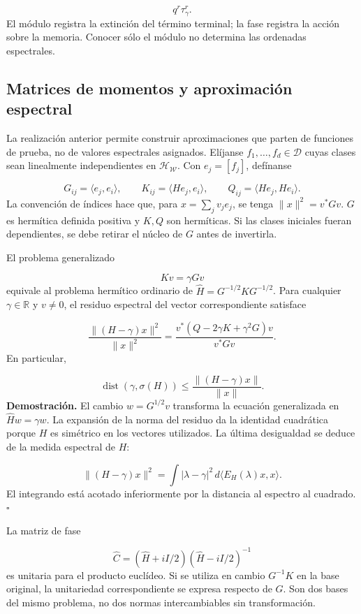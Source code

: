 \[
q^r\tau_\gamma^r.
\]
El módulo registra la extinción del término terminal; la fase registra la acción sobre la memoria. Conocer sólo el módulo no determina las ordenadas espectrales.

\subsection{Matrices de momentos y aproximación espectral}
\label{viii:rz:galerkin}
La realización anterior permite construir aproximaciones que parten de funciones de prueba, no de valores espectrales asignados. Elíjanse \(f_1,\ldots,f_d\in\mathcal D\) cuyas clases sean linealmente independientes en \(\mathcal H_{\mathscr W}\). Con \(e_j=[f_j]\), defínanse

\[
G_{ij}=\langle e_j,e_i\rangle,\qquad
K_{ij}=\langle He_j,e_i\rangle,\qquad
Q_{ij}=\langle He_j,He_i\rangle.
\]
La convención de índices hace que, para \(x=\sum_jv_je_j\), se tenga \(\|x\|^2=v^*Gv\). \(G\) es hermítica definida positiva y \(K,Q\) son hermíticas. Si las clases iniciales fueran dependientes, se debe retirar el núcleo de \(G\) antes de invertirla.

El problema generalizado

\[
Kv=\gamma Gv
\]
equivale al problema hermítico ordinario de \(\widehat H=G^{-1/2}KG^{-1/2}\). Para cualquier \(\gamma\in\mathbb R\) y \(v\neq0\), el residuo espectral del vector correspondiente satisface

\[
\frac{\|(H-\gamma)x\|^2}{\|x\|^2}
=\frac{v^*(Q-2\gamma K+\gamma^2G)v}{v^*Gv}.
\]
En particular,

\[
\operatorname{dist}(\gamma,\sigma(H))
\leq\frac{\|(H-\gamma)x\|}{\|x\|}.
\]
\textbf{Demostración.} El cambio \(w=G^{1/2}v\) transforma la ecuación generalizada en \(\widehat Hw=\gamma w\). La expansión de la norma del residuo da la identidad cuadrática porque \(H\) es simétrico en los vectores utilizados. La última desigualdad se deduce de la medida espectral de \(H\):

\[
\|(H-\gamma)x\|^2
=\int |\lambda-\gamma|^2\,d\langle E_H(\lambda)x,x\rangle.
\]
El integrando está acotado inferiormente por la distancia al espectro al cuadrado. \hfill\(\square\)

La matriz de fase

\[
\widehat C=(\widehat H+iI/2)(\widehat H-iI/2)^{-1}
\]
es unitaria para el producto euclídeo. Si se utiliza en cambio \(G^{-1}K\) en la base original, la unitariedad correspondiente se expresa respecto de \(G\). Son dos bases del mismo problema, no dos normas intercambiables sin transformación.

